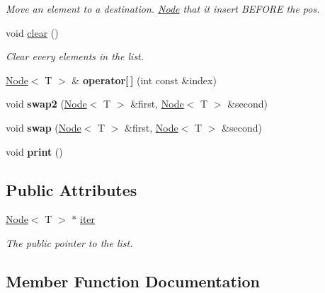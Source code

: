 \begin{DoxyCompactItemize}
\begin{DoxyCompactList}\small\item\em Move an element to a destination. \hyperlink{struct_node}{Node} that it insert B\+E\+F\+O\+RE the pos. \end{DoxyCompactList}\item 
void \hyperlink{class_list_ae296516a252e11963dbf963727ce429a}{clear} ()
\begin{DoxyCompactList}\small\item\em Clear every elements in the list. \end{DoxyCompactList}\item 
\mbox{\label{class_list_a8112bcf1ec3cbbc681dd54073d299c03}} 
\hyperlink{struct_node}{Node}$<$ T $>$ \& {\bfseries operator\mbox{[}$\,$\mbox{]}} (int const \&index)
\item 
\mbox{\label{class_list_a8fb146e3a7ae88e7634065e57464c484}} 
void {\bfseries swap2} (\hyperlink{struct_node}{Node}$<$ T $>$ \&first, \hyperlink{struct_node}{Node}$<$ T $>$ \&second)
\item 
\mbox{\label{class_list_a05c720c443e157c341c810decc9d9e01}} 
void {\bfseries swap} (\hyperlink{struct_node}{Node}$<$ T $>$ \&first, \hyperlink{struct_node}{Node}$<$ T $>$ \&second)
\item 
\mbox{\label{class_list_a67760ff5954e207fc9aa8d537675b8a0}} 
void {\bfseries print} ()
\end{DoxyCompactItemize}
\subsection*{Public Attributes}
\begin{DoxyCompactItemize}
\item 
\hyperlink{struct_node}{Node}$<$ T $>$ $\ast$ \hyperlink{class_list_a36398f758397060735c8df9f7d11235d}{iter}
\begin{DoxyCompactList}\small\item\em The public pointer to the list. \end{DoxyCompactList}\end{DoxyCompactItemize}


\subsection{Member Function Documentation}
\mbox{\label{class_list_a0e0849a1ca10791cb2788ec41af14c26}} 
